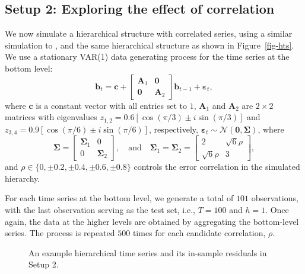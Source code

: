 \documentclass[
  11pt]{article}
\theoremstyle{plain}
\theoremstyle{remark}
\begin{document}
\subsection{Setup 2: Exploring the effect of
correlation}\label{sec-sim2}

We now simulate a hierarchical structure with correlated series, using a
similar simulation to \citet{Wickramasuriya2021-am}, and the same
hierarchical structure as shown in Figure~\ref{fig-hts}. We use a
stationary VAR(1) data generating process for the time series at the
bottom level: \[
\bm{b}_t= \bm{c} + \left[\begin{array}{cc}
\bm{A}_1 & \bm{0} \\
\bm{0} & \bm{A}_2
\end{array}\right] \bm{b}_{t-1} + \bm{\varepsilon}_t,
\] where \(\bm{c}\) is a constant vector with all entries set to \(1\),
\(\bm{A}_1\) and \(\bm{A}_2\) are \(2 \times 2\) matrices with
eigenvalues \(z_{1,2}=0.6[\cos (\pi / 3) \pm i \sin (\pi / 3)]\) and
\(z_{3,4}=0.9[\cos (\pi / 6) \pm i \sin (\pi / 6)]\), respectively,
\(\bm{\varepsilon}_t \sim \mathcal{N}(\bm{0}, \bm{\Sigma})\), where \[
\bm{\Sigma}=\left[\begin{array}{cc}
\bm{\Sigma}_1 & 0 \\0 & \bm{\Sigma}_2
\end{array}\right], \quad\text{and}\quad \bm{\Sigma}_1=\bm{\Sigma}_2=\left[\begin{array}{cc}2 & \sqrt{6} \rho \\\sqrt{6} \rho & 3\end{array}\right],
\] and \(\rho \in \{0, \pm 0.2, \pm 0.4, \pm 0.6, \pm 0.8\}\) controls
the error correlation in the simulated hierarchy.

For each time series at the bottom level, we generate a total of \(101\)
observations, with the last observation serving as the test set, i.e.,
\(T=100\) and \(h=1\). Once again, the data at the higher levels are
obtained by aggregating the bottom-level series. The process is repeated
\(500\) times for each candidate correlation, \(\rho\).

\begin{figure}


\caption{\label{fig-corr-data}An example hierarchical time series and
its in-sample residuals in Setup 2.}

\end{figure}%
\end{document}
